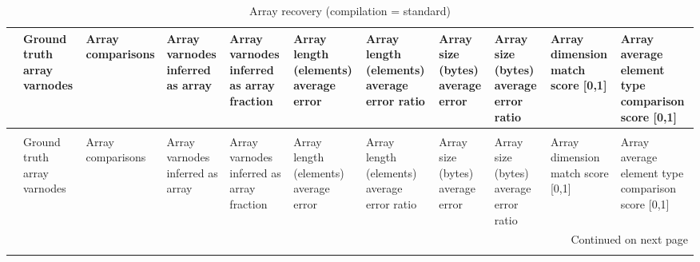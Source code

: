 \begin{longtable}{lp{1.2cm}p{1.2cm}p{1.2cm}p{1.2cm}p{1.2cm}p{1.2cm}p{1.2cm}p{1.2cm}p{1.2cm}p{1.2cm}}
\caption{Array recovery (compilation = standard)}
\label{table:array-comparisons-O0}\\
\toprule
{} &  Ground truth array varnodes &  Array comparisons &  Array varnodes inferred as array &  Array varnodes inferred as array fraction &  Array length (elements) average error &  Array length (elements) average error ratio &  Array size (bytes) average error &  Array size (bytes) average error ratio &  Array dimension match score [0,1] &  Array average element type comparison score [0,1] \\
\midrule
\endfirsthead
\caption[]{Array recovery (compilation = standard)} \\
\toprule
{} &  Ground truth array varnodes &  Array comparisons &  Array varnodes inferred as array &  Array varnodes inferred as array fraction &  Array length (elements) average error &  Array length (elements) average error ratio &  Array size (bytes) average error &  Array size (bytes) average error ratio &  Array dimension match score [0,1] &  Array average element type comparison score [0,1] \\
\midrule
\endhead
\midrule
\multicolumn{11}{r}{{Continued on next page}} \\
\midrule
\endfoot


\end{longtable}
